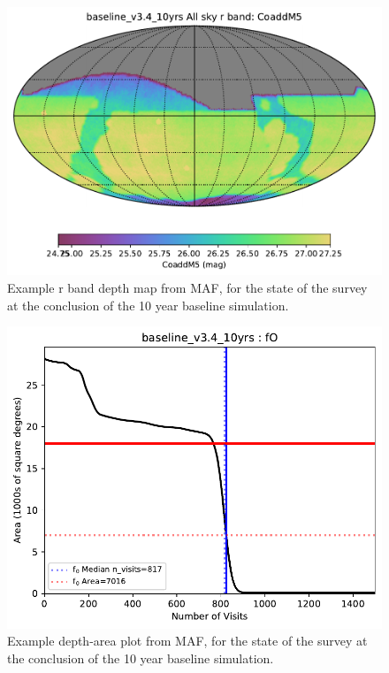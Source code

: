 \begin{figure}[htbp]
\centering
\includegraphics[width=.9\linewidth]{./figures/baseline_v3_4_10yrs_CoaddM5_All_sky_r_band_HEAL_SkyMap.pdf}
\caption{\label{fig:orgd7d1955}Example r band depth map from MAF, for the state of the survey at the conclusion of the 10 year baseline simulation.}
\end{figure}

\begin{figure}[htbp]
\centering
\includegraphics[height=0.4\textheight]{./figures/baseline_v3_4_10yrs_fO_HEAL_FO.pdf}
\caption{\label{fig:org553c866}Example depth-area plot from MAF, for the state of the survey at the conclusion of the 10 year baseline simulation.}
\end{figure}


